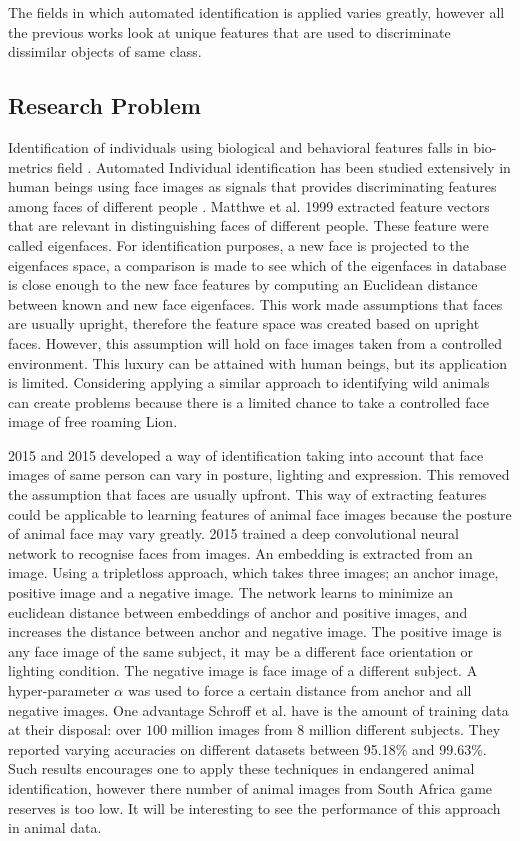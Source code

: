 The fields in which automated identification is applied varies greatly, however all the previous works look at unique features that are used to discriminate dissimilar objects of same class.    

\subsection{Research Problem} 

Identification of individuals using biological and behavioral features falls in bio-metrics field \cite{jain2004introduction}. Automated Individual identification has been studied extensively in human beings using face images as signals that provides discriminating features among faces of different people \cite{turk1991face}. Matthwe et al. 1999 \cite{turk1991face} extracted feature vectors that are relevant in distinguishing faces of different people. These feature were called eigenfaces. For identification purposes, a new face is projected to the eigenfaces space, a comparison is made to see which of the eigenfaces in database is close enough to the new face features by computing an Euclidean distance between known and new face eigenfaces. This work made assumptions that faces are usually upright, therefore the feature space was created based on upright faces. However, this assumption will hold on face images taken from a controlled environment. This luxury can be attained with human beings, but its application is limited. Considering applying a similar approach to identifying wild animals can create problems because there is a limited chance to take a controlled face image of free roaming Lion.      

\citet{schroff2015facenet} 2015 and \citet{parkhi2015deep} 2015 developed a way of identification taking into account that face images of same person can vary in posture, lighting and expression. This removed the assumption that faces are usually upfront. This way of extracting features could be applicable to learning  features of animal face images because the posture of animal face may vary greatly. \citet{schroff2015facenet} 2015 trained a deep convolutional neural network to recognise faces from images. An embedding is extracted from an image. Using a tripletloss approach, which takes three images; an anchor image, positive image and a negative image. The network learns to minimize an euclidean distance between embeddings of anchor and positive images, and increases the distance between anchor and negative image. The positive image is any face image of the same subject, it may be a different face orientation or lighting condition. The negative image is face image of a different subject. A hyper-parameter $\alpha$ was used to force a certain distance from anchor and all negative images. One advantage Schroff et al. have is the amount of training data at their disposal: over  $100$ million images from $8$ million different subjects. They reported varying accuracies on different datasets between 95.18\% and  99.63\%. Such results encourages one to apply these techniques in endangered animal identification, however there number of animal images from South Africa game reserves is too low. It will be interesting to see the performance of this approach in animal data. 

